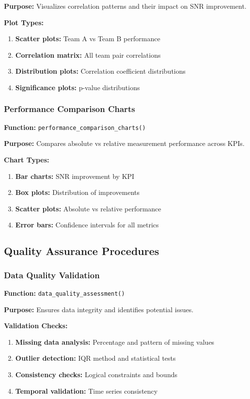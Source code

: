 \textbf{Purpose:} Visualizes correlation patterns and their impact on SNR improvement.

\textbf{Plot Types:}
\begin{enumerate}
    \item \textbf{Scatter plots:} Team A vs Team B performance
    \item \textbf{Correlation matrix:} All team pair correlations
    \item \textbf{Distribution plots:} Correlation coefficient distributions
    \item \textbf{Significance plots:} p-value distributions
\end{enumerate}

\subsubsection{Performance Comparison Charts}

\textbf{Function:} \texttt{performance\_comparison\_charts()}

\textbf{Purpose:} Compares absolute vs relative measurement performance across KPIs.

\textbf{Chart Types:}
\begin{enumerate}
    \item \textbf{Bar charts:} SNR improvement by KPI
    \item \textbf{Box plots:} Distribution of improvements
    \item \textbf{Scatter plots:} Absolute vs relative performance
    \item \textbf{Error bars:} Confidence intervals for all metrics
\end{enumerate}

\subsection{Quality Assurance Procedures}

\subsubsection{Data Quality Validation}

\textbf{Function:} \texttt{data\_quality\_assessment()}

\textbf{Purpose:} Ensures data integrity and identifies potential issues.

\textbf{Validation Checks:}
\begin{enumerate}
    \item \textbf{Missing data analysis:} Percentage and pattern of missing values
    \item \textbf{Outlier detection:} IQR method and statistical tests
    \item \textbf{Consistency checks:} Logical constraints and bounds
    \item \textbf{Temporal validation:} Time series consistency
\end{enumerate}

